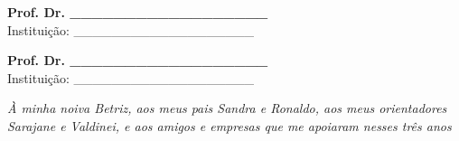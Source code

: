\documentclass[
    12pt,                %
    oneside,            %
    a4paper,            %
    english,            %
    brazil                %
    ]{abntex2ppgsi}
\begin{document}
\begin{folhadeaprovacao}
\begin{center}
\vspace*{2cm}

\textbf{Prof. Dr. \_\_\_\_\_\_\_\_\_\_\_\_\_\_\_\_\_\_}
\\ Instituição: \_\_\_\_\_\_\_\_\_\_\_\_\_\_\_\_\_\_\_

\vspace*{2cm}

\textbf{Prof. Dr. \_\_\_\_\_\_\_\_\_\_\_\_\_\_\_\_\_\_}
\\ Instituição: \_\_\_\_\_\_\_\_\_\_\_\_\_\_\_\_\_\_\_

\end{center}

\end{folhadeaprovacao}

%
%
\begin{dedicatoria}
   \vspace*{\fill}
   \centering
   \noindent
   \textit{À minha noiva Betriz, aos meus pais Sandra e Ronaldo, aos meus orientadores Sarajane e Valdinei, e aos amigos e empresas que me apoiaram nesses três anos}
     \vspace*{\fill}
\end{dedicatoria}

%
%
%

\end{document}
